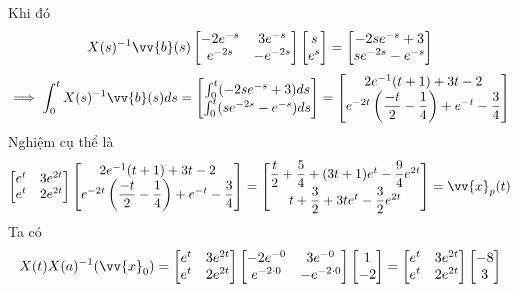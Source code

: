 \documentclass[a4paper]{article}
\begin{document}
Khi đó
\begin{equation*}
    X(s)^{-1}\vv{b}(s)
    \begin{bmatrix}
        -2e^{-s}  & 3e^{-s} \\
        e^{-2s}  & -e^{-2s}
    \end{bmatrix}
    \begin{bmatrix}
        s \\
        e^s
    \end{bmatrix}
    = 
    \begin{bmatrix}
        -2se^{-s} + 3 \\
        se^{-2s} -e^{-s}
    \end{bmatrix}
\end{equation*}
\begin{equation*}
    \implies \int_0^{t} X(s)^{-1}\vv{b}(s) ds = 
    \begin{bmatrix}
        \int_0^{t}(-2se^{-s} + 3)ds \\
        \int_0^{t}(se^{-2s} -e^{-s})ds
    \end{bmatrix}
    = 
    \begin{bmatrix}
        2e^{-1}(t+1) + 3t - 2 \\
        e^{-2t}\left(\dfrac{-t}{2} - \dfrac{1}{4}\right) + e^{-t} - \dfrac{3}{4}
    \end{bmatrix}
\end{equation*}
Nghiệm cụ thể là 
\[
    \begin{bmatrix}
        e^t & 3e^{2t} \\
        e^t & 2e^{2t}
    \end{bmatrix}
    \begin{bmatrix}
        2e^{-1}(t+1) + 3t - 2 \\
        e^{-2t}\left(\dfrac{-t}{2} - \dfrac{1}{4}\right) + e^{-t} - \dfrac{3}{4}
    \end{bmatrix}
    = 
    \begin{bmatrix}
        \dfrac{t}{2} + \dfrac{5}{4} + (3t + 1)e^{t} - \dfrac{9}{4}e^{2t} \\
        t + \dfrac{3}{2} + 3te^{t} - \dfrac{3}{2}e^{2t}
    \end{bmatrix}
    = \vv{x}_p(t)
\]
Ta có 
\[
    X(t)X(a)^{-1}(\vv{x}_0) = 
    \begin{bmatrix}
        e^t & 3e^{2t} \\
        e^t & 2e^{2t}
    \end{bmatrix}
    \begin{bmatrix}
        -2e^{-0}  & 3e^{-0} \\
        e^{-2\cdot0}  & -e^{-2\cdot0}
    \end{bmatrix}
    \begin{bmatrix}
        1 \\
        -2
    \end{bmatrix} 
    = 
    \begin{bmatrix}
        e^t & 3e^{2t} \\
        e^t & 2e^{2t}
    \end{bmatrix}
    \begin{bmatrix}
        -8 \\
        3
    \end{bmatrix}
\]
\end{document}
